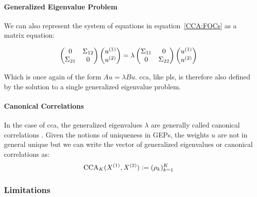 \paragraph{Generalized Eigenvalue Problem}

We can also represent the system of equations in equation~\ref{CCA:FOCs} as a matrix equation:

\begin{align}
    \begin{pmatrix}
        0           & \Sigma_{12} \\
        \Sigma_{21} & 0
    \end{pmatrix}
    \begin{pmatrix}
        u^{(1)} \\
        u^{(2)}
    \end{pmatrix}
    =
    \lambda
    \begin{pmatrix}
        \Sigma_{11} & 0           \\
        0           & \Sigma_{22}
    \end{pmatrix}
    \begin{pmatrix}
        u^{(1)} \\
        u^{(2)}
    \end{pmatrix}
\end{align}

Which is once again of the form $A u = \lambda B u$. \acrshort{cca}, like \acrshort{pls}, is therefore also defined by the solution to a single generalized eigenvalue problem.

\paragraph{Canonical Correlations}
In the case of \acrshort{cca}, the generalized eigenvalues $\lambda$ are generally called canonical correlations \citep{hotelling1935canonical, hotelling1992relations}.
Given the notions of uniqueness in GEPs, the \gls{weights} $u$ are not in general unique but we can write the vector of generalized eigenvalues or canonical correlations as:
\begin{align}
    \label{eq:cca-vector-of-correlations-def}\small
    \operatorname{CCA}_K(X^{(1)},X^{(2)}) \vcentcolon= (\rho_k)_{k=1}^K
\end{align}

\subsubsection{Limitations}

